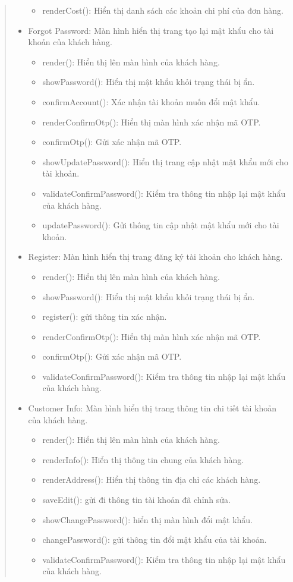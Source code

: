 \begin{quote}
\begin{itemize}
\begin{itemize}
				\item renderCost(): Hiển thị danh sách các khoản chi phí của đơn hàng.
			\end{itemize}
		\item Forgot Password: Màn hình hiển thị trang tạo lại mật khẩu cho tài khoản của khách hàng.
			\begin{itemize}
				\item render(): Hiển thị lên màn hình của khách hàng.
				\item showPassword(): Hiển thị mật khẩu khỏi trạng thái bị ẩn.
				\item confirmAccount(): Xác nhận tài khoản muốn đổi mật khẩu.
				\item renderConfirmOtp(): Hiển thị màn hình xác nhận mã OTP.
				\item confirmOtp(): Gửi xác nhận mã OTP.
				\item showUpdatePassword(): Hiển thị trang cập nhật mật khẩu mới cho tài khoản.
				\item validateConfirmPassword(): Kiểm tra thông tin nhập lại mật khẩu của khách hàng.
				\item updatePassword(): Gửi thông tin cập nhật mật khẩu mới cho tài khoản.
			\end{itemize}
		\item Register: Màn hình hiển thị trang đăng ký tài khoản cho khách hàng.
			\begin{itemize}
				\item render(): Hiển thị lên màn hình của khách hàng.
				\item showPassword(): Hiển thị mật khẩu khỏi trạng thái bị ẩn.
				\item register(): gửi thông tin xác nhận.
				\item renderConfirmOtp(): Hiển thị màn hình xác nhận mã OTP.
				\item confirmOtp(): Gửi xác nhận mã OTP.
				\item validateConfirmPassword(): Kiểm tra thông tin nhập lại mật khẩu của khách hàng.
			\end{itemize}
		\item Customer Info: Màn hình hiển thị trang thông tin chi tiết tài khoản của khách hàng.
			\begin{itemize}
				\item render(): Hiển thị lên màn hình của khách hàng.
				\item renderInfo(): Hiển thị thông tin chung của khách hàng.
				\item renderAddress(): Hiển thị thông tin địa chỉ các khách hàng.
				\item saveEdit(): gửi đi thông tin tài khoản đã chỉnh sửa.
				\item showChangePassword(): hiển thị màn hình đổi mật khẩu.
				\item changePassword(): gửi thông tin đổi mật khẩu của tài khoản.
				\item validateConfirmPassword(): Kiểm tra thông tin nhập lại mật khẩu của khách hàng.
			\end{itemize}
	\end{itemize}
\end{quote}

